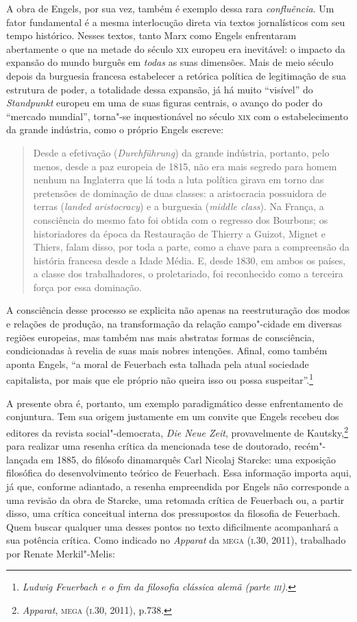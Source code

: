 A obra de Engels, por sua vez, também é exemplo dessa rara
\emph{confluência}. Um fator fundamental é a mesma interlocução direta
via textos jornalísticos com seu tempo histórico. Nesses textos, tanto
Marx como Engels enfrentaram abertamente o que na metade do século
\textsc{xix} europeu era inevitável: o impacto da expansão do mundo
burguês em \emph{todas} as suas dimensões. Mais de meio século depois da
burguesia francesa estabelecer a retórica política de legitimação de sua
estrutura de poder, a totalidade dessa expansão, já há muito ``visível''
do \emph{Standpunkt} europeu em uma de suas figuras centrais, o avanço
do poder do ``mercado mundial'', torna"-se inquestionável no século
\textsc{xix} com o estabelecimento da grande indústria, como o próprio
Engels escreve:

\begin{quote}
Desde a efetivação (\emph{Durchführung}) da grande indústria,
portanto, pelo menos, desde a paz europeia de 1815, não era mais segredo
para homem nenhum na Inglaterra que lá toda a luta política girava em
torno das pretensões de dominação de duas classes: a aristocracia
possuidora de terras (\emph{landed aristocracy}) e a burguesia
(\emph{middle class}). Na França, a consciência do mesmo fato foi obtida
com o regresso dos Bourbons; os historiadores da época da Restauração de
Thierry a Guizot, Mignet e Thiers, falam disso, por toda a parte, como a
chave para a compreensão da história francesa desde a Idade Média. E,
desde 1830, em ambos os países, a classe dos trabalhadores, o
proletariado, foi reconhecido como a terceira força por essa dominação.
\end{quote}

A consciência desse processo se explicita não apenas na reestruturação
dos modos e relações de produção, na transformação da relação
campo"-cidade em diversas regiões europeias, mas também nas mais
abstratas formas de consciência, condicionadas à revelia de suas mais
nobres intenções. Afinal, como também aponta Engels, ``a moral de
Feuerbach esta talhada pela atual sociedade capitalista, por mais que
ele próprio não queira isso ou possa suspeitar''.\footnote{\emph{Ludwig
  Feuerbach e o fim da filosofia clássica alemã (parte \textsc{iii})}.}

A presente obra é, portanto, um exemplo paradigmático desse
enfrentamento de conjuntura. Tem sua origem justamente em um convite que
Engels recebeu dos editores da revista social"-democrata, \emph{Die
Neue Zeit}, provavelmente de Kautsky,\footnote{\emph{Apparat},
  \textsc{mega} (\textsc{i}.30, 2011), p.738.} para realizar uma
resenha crítica da mencionada tese de doutorado, recém"-lançada em
1885, do filósofo dinamarquês Carl Nicolaj Starcke: uma exposição
filosófica do desenvolvimento teórico de Feuerbach. Essa informação
importa aqui, já que, conforme adiantado, a resenha empreendida por
Engels não corresponde a uma revisão da obra de Starcke, uma retomada
crítica de Feuerbach ou, a partir disso, uma crítica conceitual interna
dos pressupostos da filosofia de Feuerbach. Quem buscar qualquer uma
desses pontos no texto dificilmente acompanhará a sua potência crítica.
Como indicado no \emph{Apparat} da \textsc{mega} (\textsc{i}.30, 2011),
trabalhado por Renate Merkil"-Melis:


